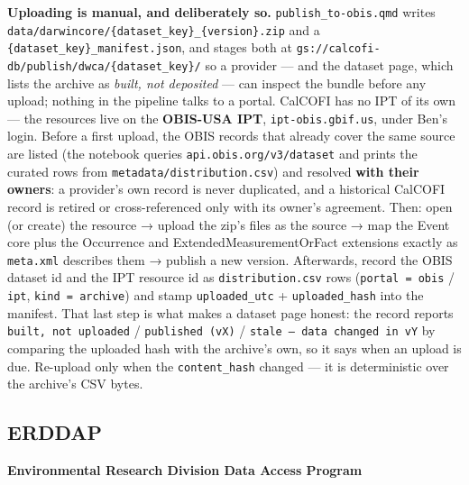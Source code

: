 \documentclass[
  letterpaper,
  DIV=11,
  numbers=noendperiod]{scrreprt}
\begin{document}
\textbf{Uploading is manual, and deliberately so.}
\texttt{publish\_to-obis.qmd} writes
\texttt{data/darwincore/\{dataset\_key\}\_\{version\}.zip} and a
\texttt{\{dataset\_key\}\_manifest.json}, and stages both at
\texttt{gs://calcofi-db/publish/dwca/\{dataset\_key\}/} so a provider
--- and the dataset page, which lists the archive as \emph{built, not
deposited} --- can inspect the bundle before any upload; nothing in the
pipeline talks to a portal. CalCOFI has no IPT of its own --- the
resources live on the \textbf{OBIS-USA IPT}, \texttt{ipt-obis.gbif.us},
under Ben's login. Before a first upload, the OBIS records that already
cover the same source are listed (the notebook queries
\texttt{api.obis.org/v3/dataset} and prints the curated rows from
\texttt{metadata/distribution.csv}) and resolved \textbf{with their
owners}: a provider's own record is never duplicated, and a historical
CalCOFI record is retired or cross-referenced only with its owner's
agreement. Then: open (or create) the resource → upload the zip's files
as the source → map the Event core plus the Occurrence and
ExtendedMeasurementOrFact extensions exactly as \texttt{meta.xml}
describes them → publish a new version. Afterwards, record the OBIS
dataset id and the IPT resource id as \texttt{distribution.csv} rows
(\texttt{portal\ =\ obis} / \texttt{ipt}, \texttt{kind\ =\ archive}) and
stamp \texttt{uploaded\_utc} + \texttt{uploaded\_hash} into the
manifest. That last step is what makes a dataset page honest: the record
reports \texttt{built,\ not\ uploaded} / \texttt{published\ (vX)} /
\texttt{stale\ —\ data\ changed\ in\ vY} by comparing the uploaded hash
with the archive's own, so it says when an upload is due. Re-upload only
when the \texttt{content\_hash} changed --- it is deterministic over the
archive's CSV bytes.

\subsection{ERDDAP}\label{erddap}

\textbf{Environmental Research Division Data Access Program}
\end{document}

